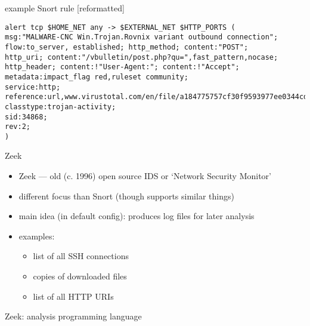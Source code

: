 \begin{frame}[fragile]{example Snort rule [reformatted]}
\begin{Verbatim}[fontsize=\small]
alert tcp $HOME_NET any -> $EXTERNAL_NET $HTTP_PORTS (
msg:"MALWARE-CNC Win.Trojan.Rovnix variant outbound connection";
flow:to_server, established; http_method; content:"POST";
http_uri; content:"/vbulletin/post.php?qu=",fast_pattern,nocase;
http_header; content:!"User-Agent:"; content:!"Accept";
metadata:impact_flag red,ruleset community;
service:http;
reference:url,www.virustotal.com/en/file/a184775757cf30f9593977ee0344cd6c54deb4b14a012a7af8e3a2cdbb85a749/analysis/;
classtype:trojan-activity;
sid:34868;
rev:2;
)
\end{Verbatim}
\end{frame}

\begin{frame}[fragile]{Zeek}
    \begin{itemize}
    \item Zeek --- old (c. 1996) open source IDS or `Network Security Monitor'
    \item different focus than Snort (though supports similar things)
    \vspace{.5cm}
    \item main idea (in default config): produces log files for later analysis
    \item examples:
        \begin{itemize}
        \item list of all SSH connections
        \item copies of downloaded files
        \item list of all HTTP URIs
        \end{itemize}
    \end{itemize}
\end{frame}

\begin{frame}{Zeek: analysis programming language}
\end{frame}
